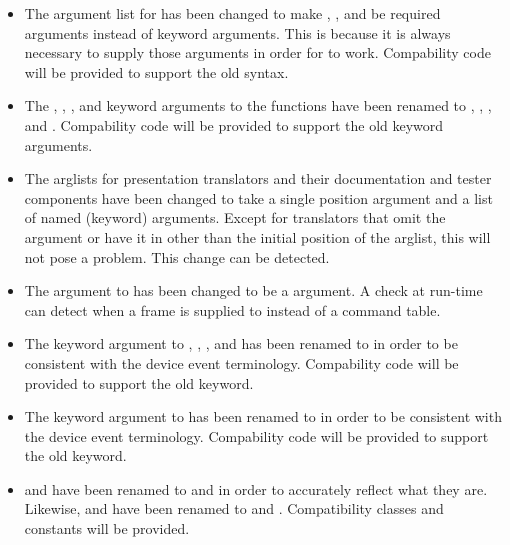 \begin{itemize}
\item The argument list for  has been changed to
make , , and  be required arguments instead of
keyword arguments.  This is because it is always necessary to supply those
arguments in order for  to work.  Compability
code will be provided to support the old syntax.

\item The , ,
, and  keyword arguments to
the  functions have been renamed to ,
, , and
.  Compability code will be provided to
support the old keyword arguments.

\item The arglists for presentation translators and their documentation and
tester components have been changed to take a single position 
argument and a list of named (keyword) arguments.  Except for translators that
omit the  argument or have it in other than the initial position of
the arglist, this will not pose a problem.  This change can be detected.

\item The  argument to  has
been changed to be a  argument.  A check at run-time
can detect when a frame is supplied to
 instead of a command table.

\item The  keyword argument to ,
, , and
 has been renamed to
 in order to be consistent with the device event terminology.
Compability code will be provided to support the old keyword.

\item The  keyword argument to  has been
renamed to  in order to be consistent with the device event
terminology.  Compability code will be provided to support the old keyword.

\item {} and  have been renamed to
 and  in order to accurately
reflect what they are.  Likewise,  and  have been
renamed to  and .  Compatibility
classes and constants will be provided.
\end{itemize}


